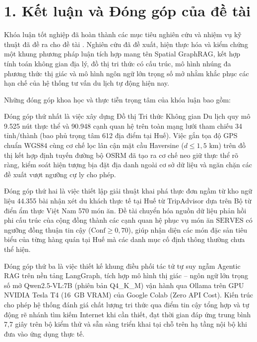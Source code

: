 \label{phan:ket-luan}

\section*{1. Kết luận và Đóng góp của đề tài}
{}

Khóa luận tốt nghiệp đã hoàn thành các mục tiêu nghiên cứu và nhiệm vụ kỹ thuật đã đề ra cho đề tài \textbf{\tendetai}. Nghiên cứu đã đề xuất, hiện thực hóa và kiểm chứng một khung phương pháp luận tích hợp mang tên Spatial GraphRAG, kết hợp tính toán không gian địa lý, đồ thị tri thức có cấu trúc, mô hình nhúng đa phương thức thị giác và mô hình ngôn ngữ lớn trọng số mở nhằm khắc phục các hạn chế của hệ thống tư vấn du lịch tự động hiện nay.

Những đóng góp khoa học và thực tiễn trọng tâm của khóa luận bao gồm:

Đóng góp thứ nhất là việc xây dựng Đồ thị Tri thức Không gian Du lịch quy mô 9.525 nút thực thể và 90.948 cạnh quan hệ trên toàn mạng lưới tham chiếu 34 tỉnh/thành (bao phủ trọng tâm 612 địa điểm tại Huế). Việc gắn tọa độ GPS chuẩn WGS84 cùng cơ chế lọc lân cận mặt cầu Haversine ($d \le 1{,}5\text{ km}$) trên đồ thị kết hợp định tuyến đường bộ OSRM đã tạo ra cơ chế neo giữ thực thể rõ ràng, kiểm soát hiện tượng bịa đặt địa danh ngoài cơ sở dữ liệu và ngăn chặn các đề xuất vượt ngưỡng cự ly cho phép.

Đóng góp thứ hai là việc thiết lập giải thuật khai phá thực đơn ngầm từ kho ngữ liệu 44.355 bài nhận xét du khách thực tế tại Huế từ TripAdvisor dựa trên Bộ từ điển ẩm thực Việt Nam 570 món ăn. Đề tài chuyển hóa nguồn dữ liệu phản hồi phi cấu trúc của cộng đồng thành các cạnh quan hệ phục vụ món ăn $\text{SERVES}$ có ngưỡng đồng thuận tin cậy ($\text{Conf} \ge 0{,}70$), giúp nhận diện các món đặc sản tiêu biểu của từng hàng quán tại Huế mà các danh mục cố định thông thường chưa thể hiện.

Đóng góp thứ ba là việc thiết kế khung điều phối tác tử tự suy ngẫm Agentic RAG trên nền tảng LangGraph, tích hợp mô hình thị giác -- ngôn ngữ lớn trọng số mở Qwen2.5-VL:7B (phiên bản Q4\_K\_M) vận hành qua Ollama trên GPU NVIDIA Tesla T4 (16~GB VRAM) của Google Colab (Zero API Cost). Kiến trúc cho phép hệ thống đánh giá chất lượng tri thức qua điểm tin cậy tổng hợp và tự động rẽ nhánh tìm kiếm Internet khi cần thiết, đạt thời gian đáp ứng trung bình 7,7 giây trên bộ kiểm thử và sẵn sàng triển khai tại chỗ trên hạ tầng nội bộ khi đưa vào ứng dụng thực tế.

